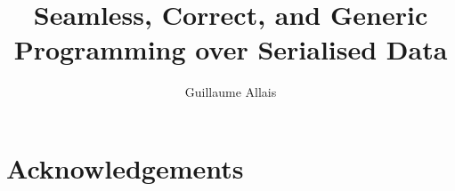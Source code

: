 \documentclass{jfp}
\begin{document}

\totalpg{\pageref{lastpage01}}

\title{Seamless, Correct, and Generic Programming over Serialised Data}

\begin{authgrp}
\author{Guillaume Allais}
\end{authgrp}




\maketitle


















\section*{Acknowledgements}





\appendix





\label{lastpage01}
\end{document}
